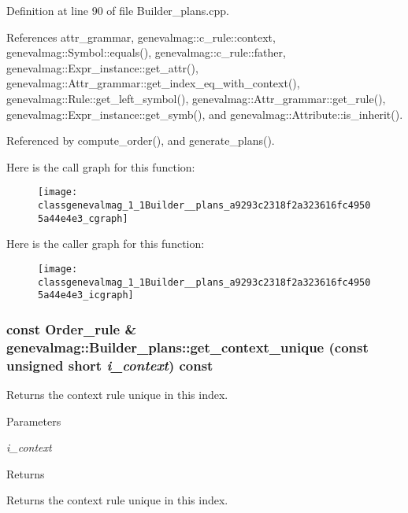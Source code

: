Definition at line 90 of file Builder\_\-plans.cpp.



References attr\_\-grammar, genevalmag::c\_\-rule::context, genevalmag::Symbol::equals(), genevalmag::c\_\-rule::father, genevalmag::Expr\_\-instance::get\_\-attr(), genevalmag::Attr\_\-grammar::get\_\-index\_\-eq\_\-with\_\-context(), genevalmag::Rule::get\_\-left\_\-symbol(), genevalmag::Attr\_\-grammar::get\_\-rule(), genevalmag::Expr\_\-instance::get\_\-symb(), and genevalmag::Attribute::is\_\-inherit().



Referenced by compute\_\-order(), and generate\_\-plans().



Here is the call graph for this function:\nopagebreak
\begin{figure}[H]
\begin{center}
\leavevmode
\texttt{[image: classgenevalmag\_1\_1Builder\_\_plans\_a9293c2318f2a323616fc49505a44e4e3\_cgraph]}
\end{center}
\end{figure}




Here is the caller graph for this function:\nopagebreak
\begin{figure}[H]
\begin{center}
\leavevmode
\texttt{[image: classgenevalmag\_1\_1Builder\_\_plans\_a9293c2318f2a323616fc49505a44e4e3\_icgraph]}
\end{center}
\end{figure}


\hypertarget{classgenevalmag_1_1Builder__plans_a72ef4716a24888c994c1b0a5c70b88a8}{
\subsubsection[{get\_\-context\_\-unique}]{\setlength{\rightskip}{0pt plus 5cm}const {\bf Order\_\-rule} \& genevalmag::Builder\_\-plans::get\_\-context\_\-unique (const unsigned short {\em i\_\-context}) const}}
\label{classgenevalmag_1_1Builder__plans_a72ef4716a24888c994c1b0a5c70b88a8}
Returns the context rule unique in this index.


\begin{DoxyParams}{Parameters}
\item[{\em i\_\-context}]\end{DoxyParams}
\begin{DoxyReturn}{Returns}

\end{DoxyReturn}
Returns the context rule unique in this index. 

